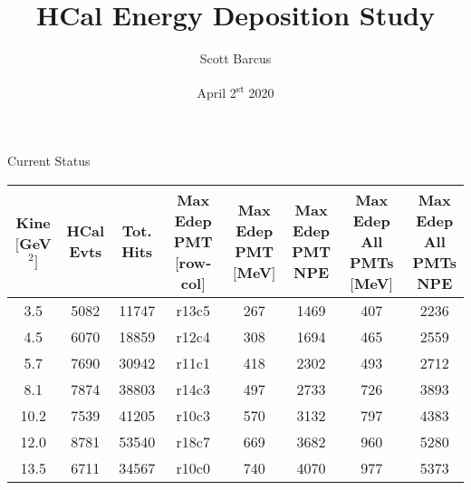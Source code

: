 \documentclass[10pt]{beamer}
\title{HCal Energy Deposition Study}
\subtitle{}
\date{April 2\textsuperscript{st} 2020}
\author{Scott Barcus}
\institute{Jefferson Lab}
\begin{document}
\maketitle

\begin{frame}{Current Status}

	\begin{table}[t]
	\centering
	\begin{tabular}{|c|ccccccc|}
	\hline
	\makecell{Kine\\$[$GeV$^2]$} & \makecell{HCal\\Evts} & \makecell{Tot.\\Hits} & \makecell{Max Edep\\PMT\\ $[$row-col$]$} & \makecell{Max\\Edep\\PMT\\$[$MeV$]$} & \makecell{Max\\Edep\\PMT\\NPE} & \makecell{Max\\Edep\\All\\PMTs\\$[$MeV$]$} & \makecell{Max\\Edep\\All\\PMTs\\NPE}\\
	\hline
	3.5 & 5082 & 11747 & r13c5 & 267 & 1469 & 407 & 2236 \\
    4.5 & 6070 & 18859 & r12c4 & 308 & 1694 & 465 & 2559 \\
    5.7 & 7690 & 30942 & r11c1 & 418 & 2302 & 493 & 2712 \\
    8.1 & 7874 & 38803 & r14c3 & 497 & 2733 & 726 & 3893 \\
    10.2 & 7539 & 41205 & r10c3 & 570 & 3132 & 797 & 4383 \\
    12.0 & 8781 & 53540 & r18c7 & 669 & 3682 & 960 & 5280 \\
    13.5 & 6711 & 34567 & r10c0 & 740 & 4070 & 977 & 5373 \\
	\hline
	\end{tabular}
	\label{tab:status}
	\end{table}
	
\end{frame}
\end{document}
